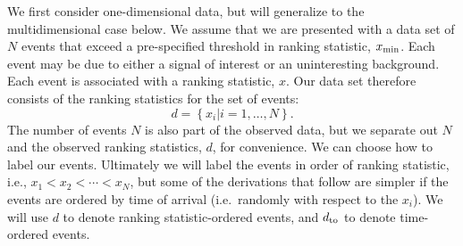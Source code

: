 \documentclass[aps,prd,reprint,nofootinbib]{revtex4-1}
\newcommand{\mathset}[1]{\left\{ #1 \right\}}
\begin{document}
We first consider one-dimensional data, but will generalize to the
multidimensional case below.  We assume that we are presented with a
data set of $N$ events that exceed a pre-specified threshold in
ranking statistic, $x_{\rm min}$.  Each event may be due to either a
signal of interest or an uninteresting background.  Each event is
associated with a ranking statistic, $x$.  Our data set therefore
consists of the ranking statistics for the set of events:
\begin{equation}
  d = \mathset{ x_i | i = 1, \ldots, N } .
\end{equation}
The number of events $N$ is also part of the observed data, but we
separate out $N$ and the observed ranking statistics, $d$, for
convenience. We can choose how to label our events. Ultimately we will
label the events in order of ranking statistic, i.e., $x_1 < x_2 <
\cdots < x_N$, but some of the derivations that follow are simpler if
the events are ordered by time of arrival (i.e.\ randomly with respect
to the $x_i$). We will use $d$ to denote ranking statistic-ordered
events, and $d_{\rm to}$ to denote time-ordered events.
\end{document}
